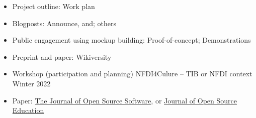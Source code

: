 \documentclass{article}
\begin{document}
\begin{itemize}
\item Project outline: Work plan


\item Blogposts: Announce, and; others


\item Public engagement using mockup building: Proof-of-concept; Demonstrations 


\item Preprint and paper: Wikiversity


\item Workshop (participation and planning) NFDI4Culure – TIB or NFDI context Winter 2022


\item Paper: \href{https://joss.theoj.org/}{The Journal of Open Source Software}, or \href{https://jose.theoj.org/about}{Journal of Open Source Education}


\end{itemize}

\printbibliography[title={Bibliography}]
\end{document}

